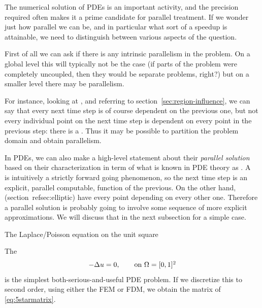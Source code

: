 The numerical solution of \acp{PDE} is an important activity,
and the precision required often makes it a prime candidate for
parallel treatment. If we wonder just how parallel we can be,
and in particular what sort of a speedup is attainable,
we need to distinguish between various aspects of the question.

First of all we can ask if there is any intrinsic parallelism
in the problem. On a global level this will typically not be the case
(if parts of the problem were completely uncoupled, then they would be
separate problems, right?) but on a smaller level there may be
parallelism. 

For instance, looking at , and referring to
section~\ref{sec:region-influence}, we can say that every next time
step is of course dependent on the previous one, but not every
individual point on the next time step is dependent on every point in
the previous step: there is a . 
Thus it may be possible to partition the problem domain and
obtain parallelism.

In \acp{PDE}, we can also make a high-level statement about their
\emph{parallel solution}
based on their characterization in term of
what is known in PDE theory as .
A~ is intuitively a strictly forward going phenomenon,
so the next time step is an explicit, parallel computable, function of the previous.
On the other hand, 
(section~ref{sec:elliptic})
have every point depending on every other one.
Therefore a parallel solution is probably going to involve
some sequence of more explicit approximations.
We will discuss that in the next subsection for a simple case.

 {The Laplace/Poisson equation on the unit square}
\label{sec:laplace-model}

The 
\begin{equation}
  -\Delta u=0,\qquad\hbox{on $\Omega=[0,1]^2$}
\end{equation}
is the simplest both-serious-and-useful \ac{PDE} problem.
If we discretize this to second order,
using either the \ac{FEM} or \ac{FDM},
we obtain the matrix of \eqref{eq:5starmatrix}.

